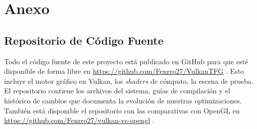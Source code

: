 \chapter{Anexo}
\label{anexo:principal}

\renewcommand{\thesection}{\arabic{section}}

\section{Repositorio de Código Fuente}
\label{anexo:repositorio}

Todo el código fuente de este proyecto está publicado en GitHub para que esté disponible de forma libre en \url{https://github.com/Fenrro27/VulkanTFG} \parencite{fenrro27_vulkan_tfg}. Esto incluye el motor gráfico en Vulkan, los \textit{shaders} de cómputo, la escena de prueba. El repositorio contiene los archivos del sistema, guías de compilación y el histórico de cambios que documenta la evolución de nuestras optimizaciones.
También está disponible el repositorio con las comparativas con OpenGL en \url{https://github.com/Fenrro27/vulkan-vs-opengl} \parencite{fenrro27_vulkan_vs_opengl}.